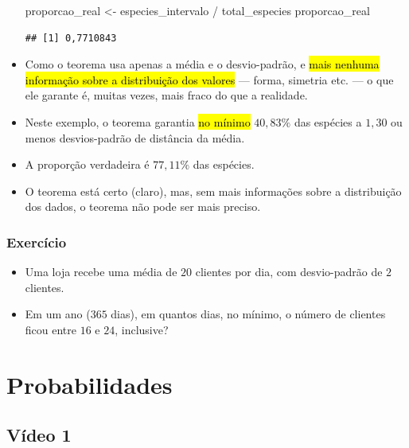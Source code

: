 \documentclass[
  11pt]{report}
\newenvironment{Shaded}{\begin{snugshade}}{\end{snugshade}}
\newcommand{\NormalTok}[1]{#1}
\newcommand{\OtherTok}[1]{\textcolor[rgb]{0.56,0.35,0.01}{#1}}
\newcommand{\SpecialCharTok}[1]{\textcolor[rgb]{0.00,0.00,0.00}{#1}}
\renewenvironment{Shaded}{
    \begin{mdframed}[%
      roundcorner=2pt,%
      innerleftmargin=5pt,%
      innerrightmargin=5pt,%
      topline=true,%
      leftline=true,%
      rightline=true,%
      bottomline=true,%
      linewidth=0.5pt,%
      linecolor=black!20,%
      backgroundcolor=black!2,%
      skipabove=2ex,%
      skipbelow=2.5ex%
    ]%
  }
  {
    \end{mdframed}
  }
\begin{document}
\begin{itemize}
\begin{Shaded}
\begin{Highlighting}[]
\NormalTok{proporcao\_real }\OtherTok{\textless{}{-}}\NormalTok{ especies\_intervalo }\SpecialCharTok{/}\NormalTok{ total\_especies}
\NormalTok{proporcao\_real}
\end{Highlighting}
\end{Shaded}

\begin{verbatim}
## [1] 0,7710843
\end{verbatim}
\item
  Como o teorema usa apenas a média e o desvio-padrão, e {\hl{mais nenhuma informação sobre a distribuição dos valores}} --- forma, simetria etc. --- o que ele garante é, muitas vezes, mais fraco do que a realidade.
\item
  Neste exemplo, o teorema garantia {\hl{no mínimo}} $40{,}83\%$ das espécies a $1{,}30$ ou menos desvios-padrão de distância da média.
\item
  A proporção verdadeira é $77{,}11\%$ das espécies.
\item
  O teorema está certo (claro), mas, sem mais informações sobre a distribuição dos dados, o teorema não pode ser mais preciso.
\end{itemize}

\hypertarget{exercuxedcio-2}{%
\subsection{Exercício}\label{exercuxedcio-2}}

\begin{itemize}
\item
  Uma loja recebe uma média de $20$ clientes por dia, com desvio-padrão de $2$ clientes.
\item
  Em um ano ($365$ dias), em quantos dias, no mínimo, o número de clientes ficou entre $16$ e $24$, inclusive?
\end{itemize}

\hypertarget{probs}{%
\chapter{Probabilidades}\label{probs}}

\hypertarget{vuxeddeo-1-4}{%
\section{Vídeo 1}\label{vuxeddeo-1-4}}
\end{document}
